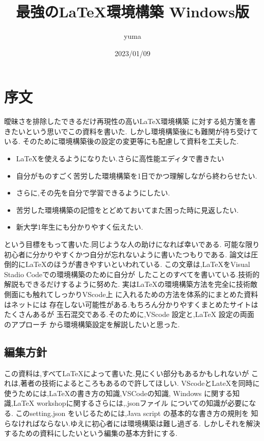 \documentclass{ltjsarticle}
\begin{document}
\title{最強の\LaTeX 環境構築 Windows版}
\author{yuma}
\date{2023/01/09}
\maketitle
\section{序文}
曖昧さを排除したできるだけ再現性の高い\LaTeX 環境構築
に対する処方箋を書きたいという思いでこの資料を書いた.
しかし環境構築後にも難関が待ち受けている.
そのために環境構築後の設定の変更等にも配慮して資料を工夫した.
\begin{itemize}
  \item \LaTeX を使えるようになりたい.さらに高性能エディタで書きたい
  \item 自分がものすごく苦労した環境構築を1日でかつ理解しながら終わらせたい.
  \item さらに,その先を自分で学習できるようにしたい.
  \item 苦労した環境構築の記憶をとどめておいてまた困った時に見返したい.
  \item 新大学1年生にも分かりやすく伝えたい.
\end{itemize}
という目標をもって書いた.同じような人の助けになれば幸いである.
可能な限り初心者に分かりやすくかつ自分が忘れないように書いたつもりである.
論文は圧倒的に\LaTeX のほうが書きやすいといわれている.
この文章は,\LaTeX をVisual Stadio Codeでの環境構築のために自分が
したことのすべてを書いている.技術的解説もできるだけするように努めた.
実は\LaTeX の環境構築方法を完全に技術敵側面にも触れてしっかりVScode上
に入れるための方法を体系的にまとめた資料はネットには
存在しない可能性がある.もちろん分かりやすくまとめたサイトはたくさんあるが
玉石混交である.そのために,VScode 設定と,LaTeX 設定の両面のアプローチ
から環境構築設定を解説したいと思った.


\subsection{編集方針}

この資料は,すべて\LaTeX によって書いた.見にくい部分もあるかもしれないが
これは,著者の技術によるところもあるので許してほしい.
VScodeとLateXを同時に使うためには,LaTeXの書き方の知識,VSCodeの知識,
Windows に関する知識,LaTeX workshopに関するさらには,.jsonファイル
についての知識が必要になる.
このsetting.json をいじるためには,Java script の基本的な書き方の規則を
知らなければならない.ゆえに初心者には環境構築は難し過ぎる.
しかしそれを解決するための資料にしたいという編集の基本方針にする.
\end{document}

